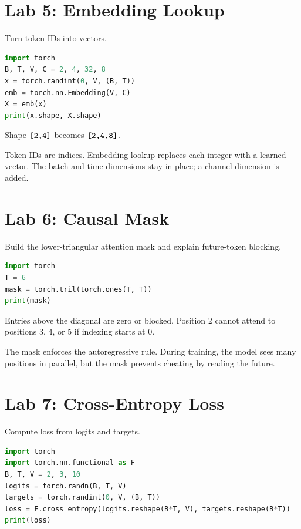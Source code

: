 \section{Lab 5: Embedding Lookup}

 Turn token IDs into vectors.


\begin{lstlisting}[language=Python]
import torch
B, T, V, C = 2, 4, 32, 8
x = torch.randint(0, V, (B, T))
emb = torch.nn.Embedding(V, C)
X = emb(x)
print(x.shape, X.shape)
\end{lstlisting}

 Shape \(\texttt{[2,4]}\) becomes \(\texttt{[2,4,8]}\).

 Token IDs are indices. Embedding lookup replaces each integer with a learned vector. The batch and time dimensions stay in place; a channel dimension is added.

\section{Lab 6: Causal Mask}

 Build the lower-triangular attention mask and explain future-token blocking.


\begin{lstlisting}[language=Python]
import torch
T = 6
mask = torch.tril(torch.ones(T, T))
print(mask)
\end{lstlisting}

 Entries above the diagonal are zero or blocked. Position 2 cannot attend to positions 3, 4, or 5 if indexing starts at 0.

 The mask enforces the autoregressive rule. During training, the model sees many positions in parallel, but the mask prevents cheating by reading the future.

\section{Lab 7: Cross-Entropy Loss}

 Compute loss from logits and targets.


\begin{lstlisting}[language=Python]
import torch
import torch.nn.functional as F
B, T, V = 2, 3, 10
logits = torch.randn(B, T, V)
targets = torch.randint(0, V, (B, T))
loss = F.cross_entropy(logits.reshape(B*T, V), targets.reshape(B*T))
print(loss)
\end{lstlisting}

